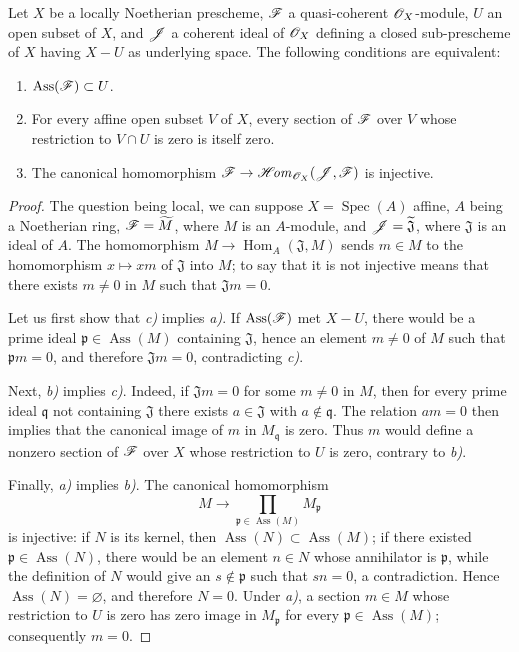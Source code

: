 
\begin{proposition}[3.1.8]
\label{IV.3.1.8}
Let $X$ be a locally Noetherian prescheme, $\mathscr{F}$ a quasi-coherent $\mathscr{O}_X$-module, $U$ an open subset of $X$, and $\mathscr{J}$ a coherent ideal of $\mathscr{O}_X$ defining a closed sub-prescheme of $X$ having $X-U$ as underlying space.
The following conditions are equivalent:
\begin{enumerate}
  \item[\emph{a)}] $\operatorname{Ass}(\mathscr{F})\subset U$.
  \item[\emph{b)}] For every affine open subset $V$ of $X$, every section of $\mathscr{F}$ over $V$ whose restriction to $V\cap U$ is zero is itself zero.
  \item[\emph{c)}] The canonical homomorphism $\mathscr{F}\to\mathscr{H}\!\mathit{om}_{\mathscr{O}_X}(\mathscr{J},\mathscr{F})$ is injective.
\end{enumerate}
\end{proposition}

\begin{proof}
The question being local, we can suppose $X=\operatorname{Spec}(A)$ affine, $A$ being a Noetherian ring, $\mathscr{F}=\widetilde{M}$, where $M$ is an $A$-module, and $\mathscr{J}=\widetilde{\mathfrak{J}}$, where $\mathfrak{J}$ is an ideal of $A$.
The homomorphism $M\to\operatorname{Hom}_A(\mathfrak{J},M)$ sends $m\in M$ to the homomorphism $x\mapsto xm$ of $\mathfrak{J}$ into $M$; to say that it is not injective means that there exists $m\neq 0$ in $M$ such that $\mathfrak{J} m=0$.

Let us first show that \emph{c)} implies \emph{a)}. If $\operatorname{Ass}(\mathscr{F})$ met $X-U$, there would be a prime ideal $\mathfrak{p}\in\operatorname{Ass}(M)$ containing $\mathfrak{J}$, hence an element $m\neq 0$ of $M$ such that $\mathfrak{p}m=0$, and therefore $\mathfrak{J}m=0$, contradicting \emph{c)}.

Next, \emph{b)} implies \emph{c)}. Indeed, if $\mathfrak{J}m=0$ for some $m\neq 0$ in $M$, then for every prime ideal $\mathfrak{q}$ not containing $\mathfrak{J}$ there exists $a\in\mathfrak{J}$ with $a\notin\mathfrak{q}$. The relation $am=0$ then implies that the canonical image of $m$ in $M_\mathfrak{q}$ is zero. Thus $m$ would define a nonzero section of $\mathscr{F}$ over $X$ whose restriction to $U$ is zero, contrary to \emph{b)}.

Finally, \emph{a)} implies \emph{b)}. The canonical homomorphism
\[
M\longrightarrow\prod_{\mathfrak{p}\in\operatorname{Ass}(M)}M_\mathfrak{p}
\]
is injective: if $N$ is its kernel, then $\operatorname{Ass}(N)\subset\operatorname{Ass}(M)$; if there existed $\mathfrak{p}\in\operatorname{Ass}(N)$, there would be an element $n\in N$ whose annihilator is $\mathfrak{p}$, while the definition of $N$ would give an $s\notin\mathfrak{p}$ such that $sn=0$, a contradiction. Hence $\operatorname{Ass}(N)=\varnothing$, and therefore $N=0$. Under \emph{a)}, a section $m\in M$ whose restriction to $U$ is zero has zero image in $M_\mathfrak{p}$ for every $\mathfrak{p}\in\operatorname{Ass}(M)$; consequently $m=0$.
\end{proof}

